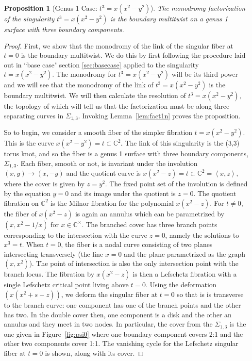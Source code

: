 \documentclass[11pt,letterpaper,reqno]{amsart}
\newtheorem{proposition}[theorem]{Proposition}
\theoremstyle{remark}
\newcommand{\CC}{{\mathbb C}}
\begin{document}
\begin{proposition}[Genus 1 Case: $t^3 = x(x^2-y^2)$] The monodromy factorization of the singularity $t^3 = x(x^2-y^2)$ is the boundary multitwist on a genus 1 surface with three boundary components.
\end{proposition}

\begin{proof} First, we show that the monodromy of the link of the singular fiber at $t=0$ is the boundary multitwist. We do this by first following the procedure laid out in ``base case" section \ref{sec:basecase} applied to the singularity $t = x(x^2-y^2)$. The monodromy for $t^3 = x(x^2-y^2)$ will be its third power and we will see that the monodromy of the link of $t^3 = x(x^2-y^2)$ is the boundary multitwist. We will then calculate the resolution of $t^3 = x(x^2-y^2)$, the topology of which will tell us that the factorization must be along three separating curves in $\Sigma_{1,3}$. Invoking Lemma~\ref{lem:fact1n} proves the proposition.

So to begin, we consider a smooth fiber of the simpler fibration $t = x(x^2-y^2)$. This is the curve $x(x^2-y^2)=t \subset \CC^2$. The link of this singularity is the (3,3) torus knot, and so the fiber is a genus 1 surface with three boundary components, $\Sigma_{1,3}$. Each fiber, smooth or not, is invariant under the involution $(x,y) \rightarrow (x,-y)$ and the quotient curve is $x(x^2 - z) = t \subset \CC^2 = \left<x,z\right>$, where the cover is given by $z = y^2$. The fixed point set of the involution is defined by the equation $y=0$ and its image under the quotient is $z=0$. The quotient fibration on $\CC^2$ is the Milnor fibration for the polynomial $x(x^2 - z)$. For $t\neq 0$, the fiber of $x(x^2 - z)$ is again an annulus which can be parametrized by $(x,x^2 - 1/x)$ for $x \in \CC^\times$. The branched cover has three branch points corresponding to the intersection with the curve $z=0$, namely the solutions to $x^3 = t$. When $t=0$, the fiber is a nodal curve consisting of two planes intersecting transversely (the line $x=0$ and the plane parametrized as the graph $(x,x^2)$). The point of intersection is also the only intersection point with the branch locus. The fibration by $x(x^2 - z)$ is then a Lefschetz fibration with a single Lefschetz critical point living above $t=0$. Using the deformation $(x(x^2 +s - z))$, we deform the singular fiber at $t=0$ so that is is transverse to the branch curve: one component has one of the branch points and the other has two. In the double cover then, one component is a disk and the other an annulus and they meet in two nodes. In particular, the cover from the $\Sigma_{1,3}$ is the one given in Figure~\ref{fig:psi0} where one boundary component covers 2:1 and the other two components cover 1:1. The vanishing cycle for the Lefschetz singular fiber at $t=0$ is shown, along with its cover.


\end{proof}
\end{document}
